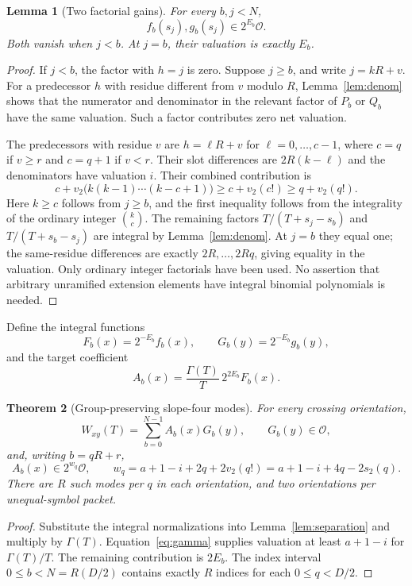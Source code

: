 \documentclass[11pt,letterpaper]{article}
\newtheorem{theorem}{Theorem}[section]
\newtheorem{lemma}[theorem]{Lemma}
\theoremstyle{definition}\newtheorem{definition}[theorem]{Definition}
\theoremstyle{remark}\newtheorem{remark}[theorem]{Remark}
\newcommand{\OO}{\mathcal O}
\newcommand{\vTwo}{v_2}
\begin{document}
\begin{lemma}[Two factorial gains]\label{lem:valuation}
For every $b,j<N$,
\[
 f_b(s_j),g_b(s_j)\in2^{E_b}\OO.
\]
Both vanish when $j<b$. At $j=b$, their valuation is exactly $E_b$.
\end{lemma}
\begin{proof}
If $j<b$, the factor with $h=j$ is zero. Suppose $j\ge b$, and write
$j=kR+v$. For a predecessor $h$ with residue different from $v$ modulo
$R$, Lemma~\ref{lem:denom} shows that the numerator and denominator in
the relevant factor of $P_b$ or $Q_b$ have the same valuation. Such a factor
contributes zero net valuation.

The predecessors with residue $v$ are $h=\ell R+v$ for
$\ell=0,\ldots,c-1$, where $c=q$ if $v\ge r$ and $c=q+1$ if $v<r$.
Their slot differences are $2R(k-\ell)$ and the denominators have valuation
$i$. Their combined contribution is
\[
 c+\vTwo\bigl(k(k-1)\cdots(k-c+1)\bigr)
 \ge c+\vTwo(c!)\ge q+\vTwo(q!).
\]
Here $k\ge c$ follows from $j\ge b$, and the first inequality follows
from the integrality of the ordinary integer $\binom{k}{c}$.
The remaining factors $T/(T+s_j-s_b)$ and $T/(T+s_b-s_j)$ are integral
by Lemma~\ref{lem:denom}. At $j=b$ they equal one; the same-residue
differences are exactly $2R,\ldots,2Rq$, giving equality in the valuation.
Only ordinary integer factorials have been used. No assertion that arbitrary
unramified extension elements have integral binomial polynomials is needed.
\end{proof}

Define the integral functions
\[
 F_b(x)=2^{-E_b}f_b(x),\qquad G_b(y)=2^{-E_b}g_b(y),
\]
and the target coefficient
\begin{equation}\label{eq:target}
 A_b(x)=\frac{\Gamma(T)}T\,2^{2E_b}F_b(x).
\end{equation}

\begin{theorem}[Group-preserving slope-four modes]\label{thm:modes}
For every crossing orientation,
\begin{equation}\label{eq:newW}
 W_{xy}(T)=\sum_{b=0}^{N-1}A_b(x)G_b(y),
 \qquad G_b(y)\in\OO,
\end{equation}
and, writing $b=qR+r$,
\begin{equation}\label{eq:weights}
 A_b(x)\in2^{w_q}\OO,\qquad
 w_q=a+1-i+2q+2\vTwo(q!)
     =a+1-i+4q-2s_2(q).
\end{equation}
There are $R$ such modes per $q$ in each orientation, and two orientations
per unequal-symbol packet.
\end{theorem}
\begin{proof}
Substitute the integral normalizations into Lemma~\ref{lem:separation}
and multiply by $\Gamma(T)$. Equation~\eqref{eq:gamma} supplies valuation
at least $a+1-i$ for $\Gamma(T)/T$. The remaining contribution is
$2E_b$. The index interval $0\le b<N=R(D/2)$ contains exactly $R$ indices
for each $0\le q<D/2$.
\end{proof}
\end{document}
